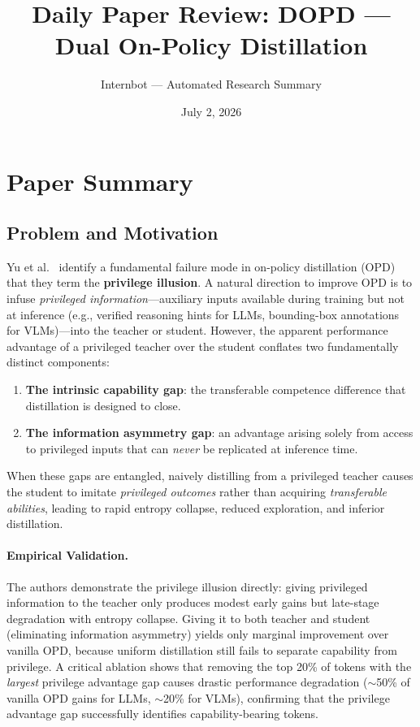 \documentclass[11pt,a4paper]{article}
\title{Daily Paper Review: DOPD --- Dual On-Policy Distillation}
\author{Internbot --- Automated Research Summary}
\date{July 2, 2026}
\begin{document}
\maketitle

\section{Paper Summary}

\subsection{Problem and Motivation}

Yu et al.~\cite{yu2026dopd} identify a fundamental failure mode in on-policy distillation (OPD) that they term the \textbf{privilege illusion}. A natural direction to improve OPD is to infuse \emph{privileged information}---auxiliary inputs available during training but not at inference (e.g., verified reasoning hints for LLMs, bounding-box annotations for VLMs)---into the teacher or student. However, the apparent performance advantage of a privileged teacher over the student conflates two fundamentally distinct components:

\begin{enumerate}
\item \textbf{The intrinsic capability gap}: the transferable competence difference that distillation is designed to close.
\item \textbf{The information asymmetry gap}: an advantage arising solely from access to privileged inputs that can \emph{never} be replicated at inference time.
\end{enumerate}

When these gaps are entangled, naively distilling from a privileged teacher causes the student to imitate \emph{privileged outcomes} rather than acquiring \emph{transferable abilities}, leading to rapid entropy collapse, reduced exploration, and inferior distillation.

\paragraph{Empirical Validation.} The authors demonstrate the privilege illusion directly: giving privileged information to the teacher only produces modest early gains but late-stage degradation with entropy collapse. Giving it to both teacher and student (eliminating information asymmetry) yields only marginal improvement over vanilla OPD, because uniform distillation still fails to separate capability from privilege. A critical ablation shows that removing the top 20\% of tokens with the \emph{largest} privilege advantage gap causes drastic performance degradation ($\sim$50\% of vanilla OPD gains for LLMs, $\sim$20\% for VLMs), confirming that the privilege advantage gap successfully identifies capability-bearing tokens.
\end{document}
